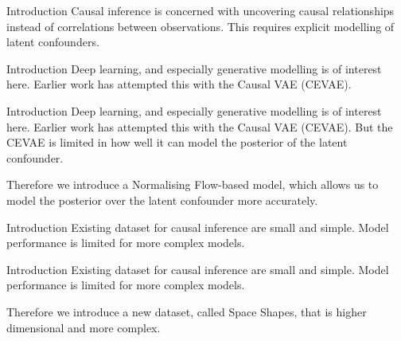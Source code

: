 \documentclass[dvipsnames, aspectratio=169]{beamer}
\begin{document}
	\begin{frame}{Introduction}
	    Causal inference is concerned with uncovering causal relationships instead of correlations between observations. This requires explicit modelling of latent confounders.
	    \begin{figure}
	        \centering
	        \qquad\qquad
	        
	    \end{figure}
	\end{frame}
	
	\begin{frame}{Introduction}
	    Deep learning, and especially generative modelling is of interest here. Earlier work has attempted this with the Causal VAE (CEVAE).
	\end{frame}
	\begin{frame}{Introduction}
	    Deep learning, and especially generative modelling is of interest here. Earlier work has attempted this with the Causal VAE (CEVAE). But the CEVAE is limited in how well it can model the posterior of the latent confounder.
	    
	    \vspace{0.5cm}
	    Therefore we introduce a Normalising Flow-based model, which allows us to model the posterior over the latent confounder more accurately.
	\end{frame}
	
	\begin{frame}{Introduction}
	    Existing dataset for causal inference are small and simple. Model performance is limited for more complex models.
	\end{frame}
	\begin{frame}{Introduction}
	    Existing dataset for causal inference are small and simple. Model performance is limited for more complex models.
	    
	    Therefore we introduce a new dataset, called Space Shapes, that is higher dimensional and more complex.
	\end{frame}
	
\end{document}
